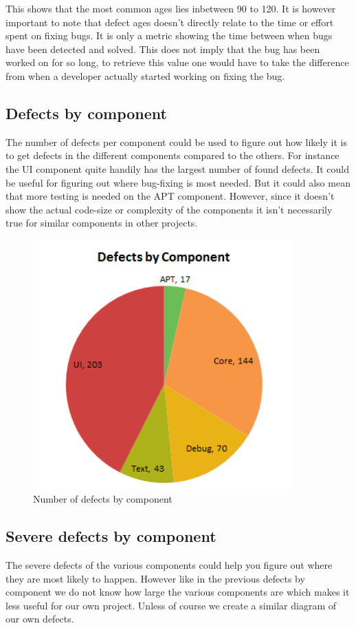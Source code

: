 \documentclass{article}
\begin{document}
This shows that the most common ages lies inbetween 90 to 120.
It is however important to note that defect ages doesn't directly relate to the time or effort spent on fixing bugs.
It is only a metric showing the time between when bugs have been detected and solved.
This does not imply that the bug has been worked on for so long, to retrieve this value one would have to take the difference from when a developer actually started working on fixing the bug.

\subsection{Defects by component}
The number of defects per component could be used to figure out how likely it is to get defects in the different components compared to the others.
For instance the UI component quite handily has the largest number of found defects. It could be useful for figuring out where bug-fixing is most needed. But it could also mean that more testing is needed on the APT component.
However, since it doesn't show the actual code-size or complexity of the components it isn't necessarily true for similar components in other projects.
\begin{figure}[H]
\center
\includegraphics[width=100mm]{defects_by_component.png}
\caption{Number of defects by component}
\end{figure}

\subsection{Severe defects by component}
The severe defects of the various components could help you figure out where they are most likely to happen.
However like in the previous defects by component we do not know how large the various components are which makes it less useful for our own project.
Unless of course we create a similar diagram of our own defects.
\end{document}

